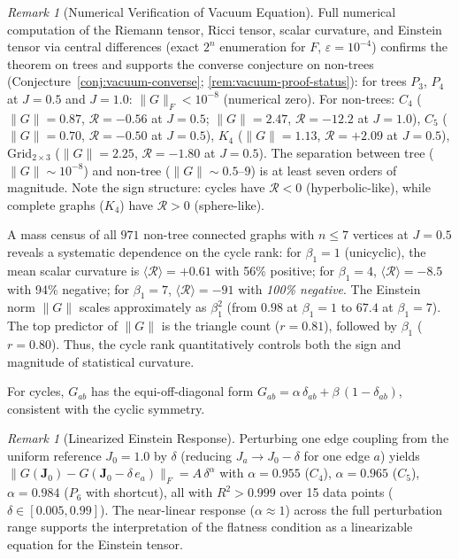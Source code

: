 \documentclass[11pt]{article}
\theoremstyle{definition}
\theoremstyle{remark}
\newtheorem{remark}[theorem]{Remark}
\newcommand{\Fish}{F}
\newcommand{\coupl}{\mathbf{J}}
\newcommand{\betti}{\beta_1}
\newcommand{\Ein}{G}
\newcommand{\Scal}{\mathcal{R}}
\begin{document}
\begin{remark}[Numerical Verification of Vacuum Equation]
\label{rem:numerical-vacuum}
Full numerical computation of the Riemann tensor, Ricci tensor, scalar
curvature, and Einstein tensor via central differences (exact $2^n$
enumeration for $\Fish$, $\varepsilon = 10^{-4}$) confirms the theorem on
trees and supports the converse conjecture on non-trees
(Conjecture~\ref{conj:vacuum-converse}; \cref{rem:vacuum-proof-status}):
for trees $P_3$, $P_4$ at $J = 0.5$ and $J = 1.0$:
$\|\Ein\|_F < 10^{-8}$ (numerical zero).
For non-trees: $C_4$ ($\|\Ein\| = 0.87$, $\Scal = -0.56$ at $J = 0.5$;
$\|\Ein\| = 2.47$, $\Scal = -12.2$ at $J = 1.0$),
$C_5$ ($\|\Ein\| = 0.70$, $\Scal = -0.50$ at $J = 0.5$),
$K_4$ ($\|\Ein\| = 1.13$, $\Scal = +2.09$ at $J = 0.5$),
Grid$_{2 \times 3}$ ($\|\Ein\| = 2.25$, $\Scal = -1.80$ at $J = 0.5$).
The separation between tree ($\|\Ein\| \sim 10^{-8}$) and non-tree
($\|\Ein\| \sim 0.5$--$9$) is at least seven orders of magnitude.
Note the sign structure: cycles have $\Scal < 0$ (hyperbolic-like),
while complete graphs ($K_4$) have $\Scal > 0$ (sphere-like).

A mass census of all $971$ non-tree connected graphs with $n \leq 7$
vertices at $J = 0.5$ reveals a systematic dependence on the cycle rank:
for $\betti = 1$ (unicyclic), the mean scalar curvature is
$\langle\Scal\rangle = +0.61$ with 56\% positive; for $\betti = 4$,
$\langle\Scal\rangle = -8.5$ with 94\% negative; for $\betti = 7$,
$\langle\Scal\rangle = -91$ with \emph{100\% negative}. The Einstein
norm $\|\Ein\|$ scales approximately as $\betti^2$ (from $0.98$ at
$\betti = 1$ to $67.4$ at $\betti = 7$). The top predictor of
$\|\Ein\|$ is the triangle count ($r = 0.81$), followed by $\betti$
($r = 0.80$). Thus, the cycle rank quantitatively controls both the
sign and magnitude of statistical curvature.

For
cycles, $\Ein_{ab}$ has the equi-off-diagonal form
$\Ein_{ab} = \alpha\,\delta_{ab} + \beta\,(1 - \delta_{ab})$, consistent
with the cyclic symmetry.
\end{remark}

\begin{remark}[Linearized Einstein Response]
\label{rem:linearized}
Perturbing one edge coupling from the uniform reference $J_0 = 1.0$
by $\delta$ (reducing $J_a \to J_0 - \delta$ for one edge $a$) yields
$\|\Ein(\coupl_0) - \Ein(\coupl_0 - \delta\, e_a)\|_F = A\,\delta^\alpha$
with $\alpha = 0.955$ ($C_4$), $\alpha = 0.965$ ($C_5$), $\alpha = 0.984$
($P_6$ with shortcut), all with $R^2 > 0.999$ over 15 data points
($\delta \in [0.005, 0.99]$). The near-linear response ($\alpha \approx 1$)
across the full perturbation range supports the interpretation of the
flatness condition as a linearizable equation for the Einstein tensor.
\end{remark}
\end{document}
